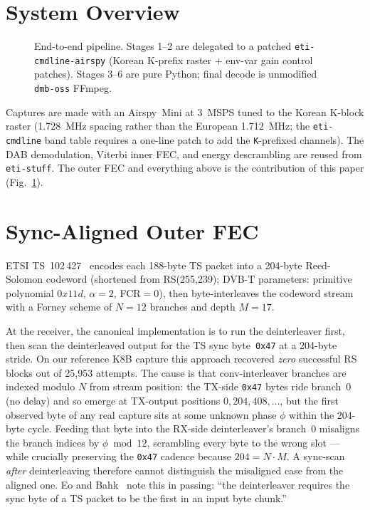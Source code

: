 \documentclass[conference,letterpaper,10pt]{IEEEtran}
\begin{document}
\section{System Overview}\label{sec:system}

\begin{figure}[t]
\centering
\resizebox{\columnwidth}{!}{%
}
\caption{End-to-end pipeline.  Stages 1--2 are delegated to a
patched \texttt{eti-cmdline-airspy} (Korean K-prefix raster +
env-var gain control patches).  Stages 3--6 are pure Python;
final decode is unmodified \texttt{dmb-oss} FFmpeg.}
\label{fig:pipeline}
\end{figure}

Captures are made with an Airspy~Mini at 3~MSPS tuned to the
Korean K-block raster (1.728~MHz spacing rather than the
European 1.712~MHz; the \texttt{eti-cmdline} band table requires
a one-line patch to add the \texttt{K}-prefixed channels).  The
DAB demodulation, Viterbi inner FEC, and energy descrambling are
reused from \texttt{eti-stuff}.  The outer FEC and everything
above is the contribution of this paper
(Fig.~\ref{fig:pipeline}).

\section{Sync-Aligned Outer FEC}\label{sec:rs}

ETSI TS~102\,427~\cite{etsi102427} encodes each 188-byte TS packet
into a 204-byte Reed-Solomon codeword (shortened from RS(255,239);
DVB-T parameters: primitive polynomial $0x11d$, $\alpha=2$, FCR$=0$),
then byte-interleaves the codeword stream with a Forney scheme of
$N=12$ branches and depth $M=17$.

At the receiver, the canonical implementation is to run the
deinterleaver first, then scan the deinterleaved output for the
TS sync byte~\texttt{0x47} at a 204-byte stride.  On our reference
K8B capture this approach recovered \emph{zero} successful RS
blocks out of 25{,}953 attempts.  The cause is that conv-interleaver
branches are indexed modulo $N$ from stream position: the
TX-side \texttt{0x47} bytes ride branch~0 (no delay) and so emerge
at TX-output positions $0,204,408,\ldots$, but the first observed
byte of any real capture sits at some unknown phase $\phi$ within
the 204-byte cycle.  Feeding that byte into the RX-side
deinterleaver's branch~0 misaligns the branch indices by
$\phi\bmod 12$, scrambling every byte to the wrong slot --- while
crucially preserving the \texttt{0x47} cadence because $204=N\cdot M$.
A sync-scan \emph{after} deinterleaving therefore cannot
distinguish the misaligned case from the aligned one.  Eo and
Bahk~\cite{eo2024tdmb} note this in passing: ``the deinterleaver
requires the sync byte of a TS packet to be the first in an
input byte chunk.''
\end{document}

